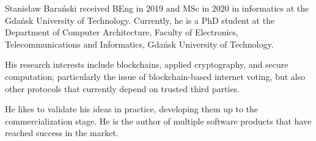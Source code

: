 \documentclass{ieeeaccess}
\begin{document}
\begin{IEEEbiography}{Stanis\l{}aw Bara{\'n}ski} received BEng in 2019 and MSc in 2020 in informatics at the Gdańsk University of Technology. 
Currently, he is a PhD student at the Department of Computer Architecture, Faculty of Electronics, Telecommunications and Informatics, Gdańsk University of Technology.

His research interests include blockchains, applied cryptography, and secure computation; particularly the issue of blockchain-based internet voting, but also other protocols that currently depend on trusted third parties.

He likes to validate his ideas in practice, developing them up to the commercialization stage. He is the author of multiple software products that have reached success in the market.
\end{IEEEbiography}
\end{document}
